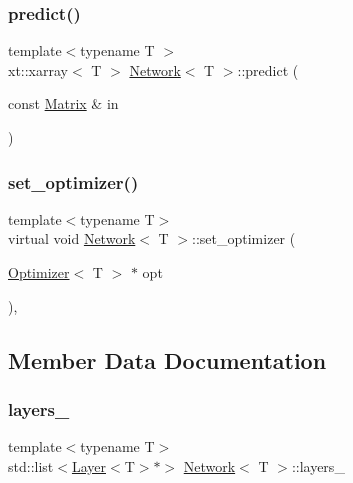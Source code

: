 \mbox{\label{class_network_a7359736e7e47ad98b4946b1b719c1c30}} 
\subsubsection{\texorpdfstring{predict()}{predict()}}
{\footnotesize\ttfamily template$<$typename T $>$ \\
xt\+::xarray$<$ T $>$ \mbox{\hyperlink{class_network}{Network}}$<$ T $>$\+::predict (\begin{DoxyParamCaption}\item[{const \mbox{\hyperlink{class_network_a3217727df6a4bde68fb686293258d7f6}{Matrix}} \&}]{in }\end{DoxyParamCaption})\hspace{0.3cm}{\ttfamily [virtual]}}

\mbox{\label{class_network_a1b4d20bb15c3caddb1b648f96d682722}} 
\subsubsection{\texorpdfstring{set\_optimizer()}{set\_optimizer()}}
{\footnotesize\ttfamily template$<$typename T$>$ \\
virtual void \mbox{\hyperlink{class_network}{Network}}$<$ T $>$\+::set\+\_\+optimizer (\begin{DoxyParamCaption}\item[{\mbox{\hyperlink{class_optimizer}{Optimizer}}$<$ T $>$ $\ast$}]{opt }\end{DoxyParamCaption})\hspace{0.3cm}{\ttfamily [inline]}, {\ttfamily [virtual]}}



\subsection{Member Data Documentation}
\mbox{\label{class_network_a44ed9431544add6652254104c3413d4c}} 
\subsubsection{\texorpdfstring{layers\_}{layers\_}}
{\footnotesize\ttfamily template$<$typename T$>$ \\
std\+::list$<$\mbox{\hyperlink{class_layer}{Layer}}$<$T$>$$\ast$$>$ \mbox{\hyperlink{class_network}{Network}}$<$ T $>$\+::layers\+\_\+\hspace{0.3cm}{\ttfamily [protected]}}

